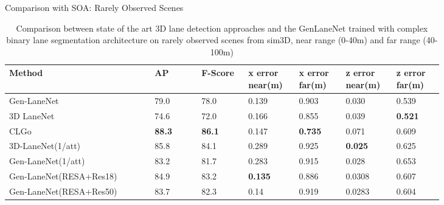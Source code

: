 \documentclass[aspectratio=169]{beamer}
\begin{document}
\begin{frame}{Comparison with SOA: Rarely Observed Scenes}
     \begin{table}[h]
     \small
    \centering
    \caption{Comparison between state of the art 3D lane detection approaches and the GenLaneNet trained with complex binary lane segmentation architecture on rarely observed scenes from sim3D, near range (0-40m) and far range (40-100m) }
    \begin{tabular}{|p{0.29\linewidth}|p{0.09\linewidth}|p{0.09\linewidth}|p{0.09\linewidth}|p{0.09\linewidth}|p{0.09\linewidth}|p{0.09\linewidth}|}
    \hline
        \textbf{Method} & \textbf{AP} & \textbf{F-Score} & \textbf{x error near(m)} & \textbf{x error far(m)} & \textbf{z error near(m)} & \textbf{z error far(m)} \\ \hline
        Gen-LaneNet & 79.0 & 78.0 & 0.139 & 0.903 & 0.030 & 0.539 \\ \hline
        3D LaneNet & 74.6 & 72.0 & 0.166 & 0.855 & 0.039 &\textbf{ 0.521} \\ \hline
        CLGo &\textbf{ 88.3} &\textbf{ 86.1} & 0.147 & \textbf{0.735} & 0.071 & 0.609 \\ \hline
        3D-LaneNet(1/att)& 85.8 & 84.1 & 0.289 & 0.925 &\textbf{ 0.025} & 0.625 \\ \hline
        Gen-LaneNet(1/att)& 83.2 & 81.7 & 0.283 & 0.915 & 0.028 & 0.653 \\ \hline
        Gen-LaneNet(RESA+Res18) &  84.9 & 83.2 &\textbf{ 0.135} & 0.886 & 0.0308 & 0.607 \\ \hline
        Gen-LaneNet(RESA+Res50) & 83.7 & 82.3 & 0.14 & 0.919 & 0.0283 & 0.604 \\ \hline
    \end{tabular}
\end{table}
\end{frame}
\end{document}
